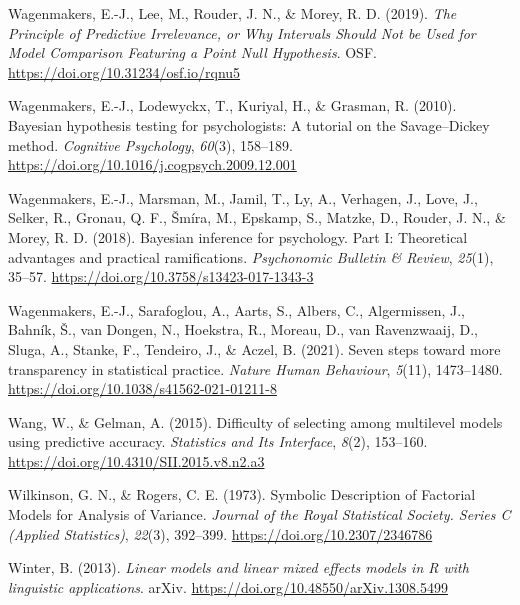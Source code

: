 \documentclass[
  doc,12pt,floatsintext]{apa7}
\newlength{\cslhangindent}
\newenvironment{CSLReferences}[2] %
 {\begin{list}{}{%
  \setlength{\itemindent}{0pt}
  \setlength{\leftmargin}{0pt}
  \setlength{\parsep}{0pt}
  \ifodd #1
   \setlength{\leftmargin}{\cslhangindent}
   \setlength{\itemindent}{-1\cslhangindent}
  \fi
  \setlength{\itemsep}{#2\baselineskip}}}
 {\end{list}}
\begin{document}
\begin{CSLReferences}{1}{0}
Wagenmakers, E.-J., Lee, M., Rouder, J. N., \& Morey, R. D. (2019). \emph{The {Principle} of {Predictive Irrelevance}, or {Why Intervals Should Not} be {Used} for {Model Comparison Featuring} a {Point Null Hypothesis}}. OSF. \url{https://doi.org/10.31234/osf.io/rqnu5}

Wagenmakers, E.-J., Lodewyckx, T., Kuriyal, H., \& Grasman, R. (2010). Bayesian hypothesis testing for psychologists: {A} tutorial on the {Savage}--{Dickey} method. \emph{Cognitive Psychology}, \emph{60}(3), 158--189. \url{https://doi.org/10.1016/j.cogpsych.2009.12.001}

Wagenmakers, E.-J., Marsman, M., Jamil, T., Ly, A., Verhagen, J., Love, J., Selker, R., Gronau, Q. F., Šmíra, M., Epskamp, S., Matzke, D., Rouder, J. N., \& Morey, R. D. (2018). Bayesian inference for psychology. {Part I}: {Theoretical} advantages and practical ramifications. \emph{Psychonomic Bulletin \& Review}, \emph{25}(1), 35--57. \url{https://doi.org/10.3758/s13423-017-1343-3}

Wagenmakers, E.-J., Sarafoglou, A., Aarts, S., Albers, C., Algermissen, J., Bahník, Š., van Dongen, N., Hoekstra, R., Moreau, D., van Ravenzwaaij, D., Sluga, A., Stanke, F., Tendeiro, J., \& Aczel, B. (2021). Seven steps toward more transparency in statistical practice. \emph{Nature Human Behaviour}, \emph{5}(11), 1473--1480. \url{https://doi.org/10.1038/s41562-021-01211-8}

Wang, W., \& Gelman, A. (2015). Difficulty of selecting among multilevel models using predictive accuracy. \emph{Statistics and Its Interface}, \emph{8}(2), 153--160. \url{https://doi.org/10.4310/SII.2015.v8.n2.a3}

Wilkinson, G. N., \& Rogers, C. E. (1973). Symbolic {Description} of {Factorial Models} for {Analysis} of {Variance}. \emph{Journal of the Royal Statistical Society. Series C (Applied Statistics)}, \emph{22}(3), 392--399. \url{https://doi.org/10.2307/2346786}

Winter, B. (2013). \emph{Linear models and linear mixed effects models in {R} with linguistic applications}. arXiv. \url{https://doi.org/10.48550/arXiv.1308.5499}

\end{CSLReferences}

\newpage



\end{document}
